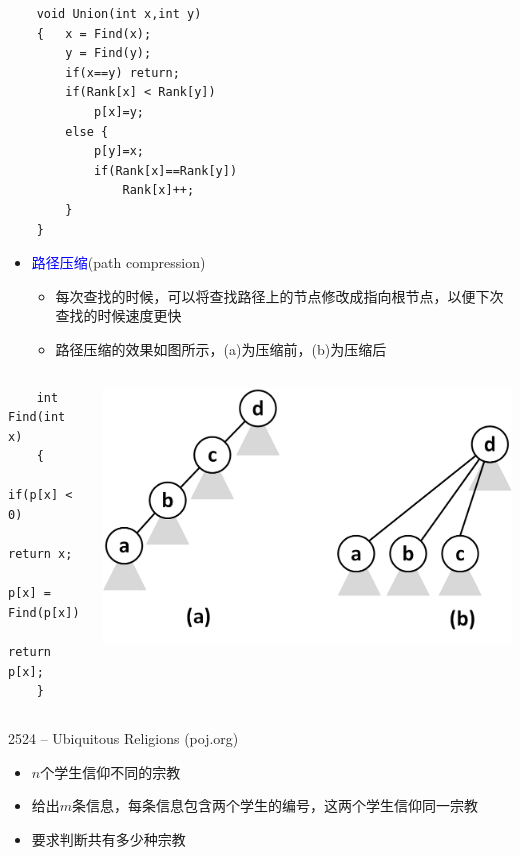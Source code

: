 \begin{lstlisting}
    void Union(int x,int y)  
    {   x = Find(x);
        y = Find(y);
        if(x==y) return;
        if(Rank[x] < Rank[y])
            p[x]=y;
        else {
            p[y]=x;
            if(Rank[x]==Rank[y])
                Rank[x]++;
        }
    }
\end{lstlisting}
    
\vspace*{3ex}
\begin{itemize}
    \item \textcolor{blue}{路径压缩}(path compression)
    \begin{itemize}
        \item 每次查找的时候，可以将查找路径上的节点修改成指向根节点，以便下次查找的时候速度更快
        \item 路径压缩的效果如图所示，(a)为压缩前，(b)为压缩后
    \end{itemize} 
\end{itemize}
\begin{columns}
    \begin{lstlisting}
    int Find(int x)
    {
        if(p[x] < 0)
            return x;
        p[x] = Find(p[x]);
        return p[x];
    }
    \end{lstlisting}
    \includegraphics[width=\textwidth,right]{fig/6-2.png}
\end{columns}
\begin{frame}{2524 -- Ubiquitous Religions (poj.org)}
    \begin{itemize}
        \item $n$个学生信仰不同的宗教
        \vfill
        \item 给出$m$条信息，每条信息包含两个学生的编号，这两个学生信仰同一宗教
        \vfill
        \item 要求判断共有多少种宗教
    \end{itemize}
\end{frame}
